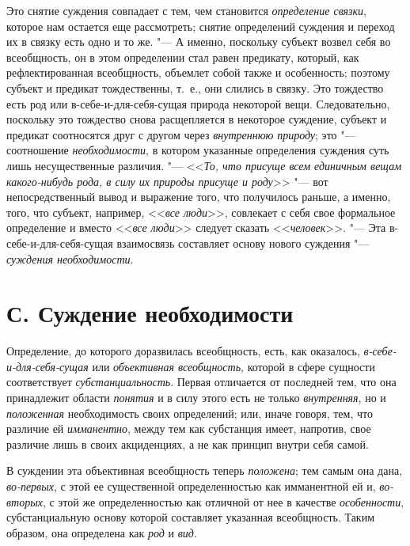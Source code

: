 {Это снятие суждения совпадает с тем, чем становится
{\em определение связки},
которое нам остается еще рассмотреть; снятие определений
суждения и переход их в связку есть одно и то же. "--- А
именно, поскольку субъект возвел себя во всеобщность, он в этом определении
стал равен предикату, который, как рефлектированная всеобщность, объемлет
собой также и особенность; поэтому субъект и предикат тождественны, т.~е.,
они слились в связку. Это тождество есть род или в-себе-и-для-себя-сущая
природа некоторой вещи. Следовательно, поскольку это тождество снова
расщепляется в некоторое суждение, субъект и предикат соотносятся друг с
другом через {\em внутреннюю
}{\em природу}; это
"--- соотношение
{\em необходимости}, в
котором указанные определения суждения суть лишь несущественные различия.
"--- <<{\em То, что присуще всем единичным
вещам какого-нибудь рода, в силу их природы присуще и роду}>>
"--- вот непосредственный вывод и выражение того, что получилось
раньше, а именно, того, что субъект, например,
<<{\em все люди}>>,
совлекает с себя свое формальное определение и вместо
<<{\em все люди}>> следует
сказать <<{\em человек}>>. "---
Эта в-себе-и-для-себя-сущая взаимосвязь составляет основу
нового суждения "--- {\em суждения
необходимости}.

\section[С. Суждение необходимости]{С. Суждение необходимости}
Определение, до которого доразвилась всеобщность, есть, как
оказалось,
{\em в-себе-и-для-себя-сущая}
или {\em объективная
всеобщность}, которой в сфере сущности соответствует
{\em субстанциальность}.
Первая отличается от последней тем, что она принадлежит
области {\em понятия} и в
силу этого есть не только
{\em внутренняя}, но и
{\em положенная}
необходимость своих определений; или, иначе говоря, тем, что
различие ей {\em имманентно},
между тем как субстанция имеет, напротив, свое различие лишь
в своих акциденциях, а не как принцип внутри себя самой.

В суждении эта объективная всеобщность теперь
{\em положена}; тем самым
она дана, {\em во-первых},
с этой ее существенной определенностью как имманентной ей и,
{\em во-вторых}, с этой
же определенностью как отличной от нее в качестве
{\em особенности},
субстанциальную основу которой составляет указанная
всеобщность. Таким образом, она определена как
{\em род} и
{\em вид}.

}
